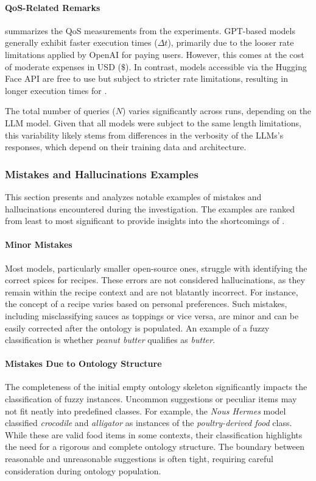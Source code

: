 \paragraph{\Gls{QoS}-Related Remarks}
%

%
 summarizes the \gls{QoS} measurements from the experiments.
%
GPT-based models generally exhibit faster execution times (\(\Delta t\)), primarily due to the looser rate limitations applied by OpenAI for paying users.
%
However, this comes at the cost of moderate expenses in USD (\(\$\)).
%
In contrast, models accessible via the Hugging Face API are free to use but subject to stricter rate limitations, resulting in longer execution times for \llmfkg{}.

The total number of queries (\(N\)) varies significantly across runs, depending on the \gls{LLM} model.
%
Given that all models were subject to the same length limitations, this variability likely stems from differences in the verbosity of the \glspl{LLM}'s responses, which depend on their training data and architecture.

\subsubsection{Mistakes and Hallucinations Examples}
\label{sssec:interesting_samples}
%
This section presents and analyzes notable examples of mistakes and hallucinations encountered during the investigation.
%
The examples are ranked from least to most significant to provide insights into the shortcomings of \llmfkg{}.

\paragraph{Minor Mistakes}
%
Most models, particularly smaller open-source ones, struggle with identifying the correct spices for recipes.
%
These errors are not considered hallucinations, as they remain within the recipe context and are not blatantly incorrect.
%
For instance, the concept of a recipe varies based on personal preferences.
%
Such mistakes, including misclassifying sauces as toppings or vice versa, are minor and can be easily corrected after the ontology is populated.
%
An example of a fuzzy classification is whether \emph{peanut butter} qualifies as \emph{butter}.

\paragraph{Mistakes Due to Ontology Structure}
%
The completeness of the initial empty ontology skeleton significantly impacts the classification of fuzzy instances.
%
Uncommon suggestions or peculiar items may not fit neatly into predefined classes.
%
For example, the \emph{Nous Hermes} model classified \emph{crocodile} and \emph{alligator} as instances of the \emph{poultry-derived food} class.
%
While these are valid food items in some contexts, their classification highlights the need for a rigorous and complete ontology structure.
%
The boundary between reasonable and unreasonable suggestions is often tight, requiring careful consideration during ontology population.

